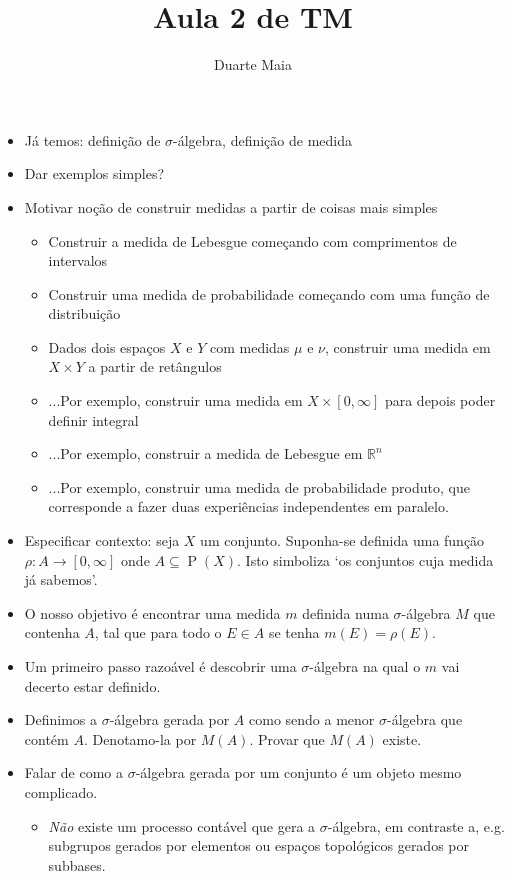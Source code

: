 \documentclass{article}
\title{Aula 2 de TM}
\author{Duarte Maia}
\date{}
\newcommand{\R}{\mathbb{R}}
\DeclareMathOperator{\ps}{P}
\begin{document}
\maketitle
\vspace{-1cm}
\begin{itemize}
\item Já temos: definição de $\sigma$-álgebra, definição de medida
\item Dar exemplos simples?
\item Motivar noção de construir medidas a partir de coisas mais simples
\begin{itemize}
\item Construir a medida de Lebesgue começando com comprimentos de intervalos
\item Construir uma medida de probabilidade começando com uma função de distribuição
\item Dados dois espaços $X$ e $Y$ com medidas $\mu$ e $\nu$, construir uma medida em $X \times Y$ a partir de retângulos
\item ...Por exemplo, construir uma medida em $X \times \left[0,\infty\right]$ para depois poder definir integral
\item ...Por exemplo, construir a medida de Lebesgue em $\R^n$
\item ...Por exemplo, construir uma medida de probabilidade produto, que corresponde a fazer duas experiências independentes em paralelo.
\end{itemize}
\item Especificar contexto: seja $X$ um conjunto. Suponha-se definida uma função $\rho : A \to [0,\infty]$ onde $A \subseteq \ps(X)$. Isto simboliza `os conjuntos cuja medida já sabemos'.
\item O nosso objetivo é encontrar uma medida $m$ definida numa $\sigma$-álgebra $M$ que contenha $A$, tal que para todo o $E \in A$ se tenha $m(E) = \rho(E)$.
\item Um primeiro passo razoável é descobrir uma $\sigma$-álgebra na qual o $m$ vai decerto estar definido.
\item Definimos a $\sigma$-álgebra gerada por $A$ como sendo a menor $\sigma$-álgebra que contém $A$. Denotamo-la por $M(A)$. Provar que $M(A)$ existe.
\item Falar de como a $\sigma$-álgebra gerada por um conjunto é um objeto mesmo complicado.
\begin{itemize}
\item \emph{Não} existe um processo contável que gera a $\sigma$-álgebra, em contraste a, e.g. subgrupos gerados por elementos ou espaços topológicos gerados por subbases.

\end{itemize}
\end{itemize}
\end{document}
